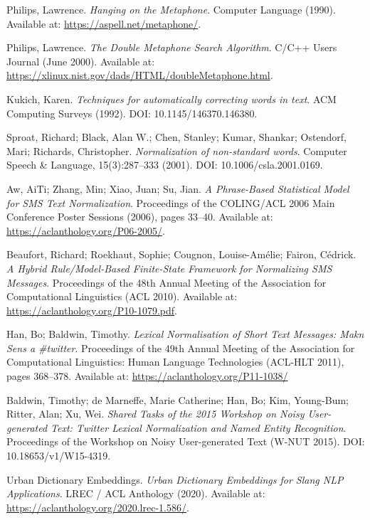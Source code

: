 \documentclass[12pt]{article}
\begin{document}
\begin{thebibliography}{9}
Philips, Lawrence.
\textit{Hanging on the Metaphone}.
Computer Language (1990).
Available at: \url{https://aspell.net/metaphone/}.

Philips, Lawrence.
\textit{The Double Metaphone Search Algorithm}.
C/C++ Users Journal (June 2000).
Available at: \url{https://xlinux.nist.gov/dads/HTML/doubleMetaphone.html}.

Kukich, Karen.
\textit{Techniques for automatically correcting words in text}.
ACM Computing Surveys (1992).
DOI: 10.1145/146370.146380.

Sproat, Richard; Black, Alan W.; Chen, Stanley; Kumar, Shankar; Ostendorf, Mari; Richards, Christopher.
\textit{Normalization of non-standard words}.
Computer Speech \& Language, 15(3):287–333 (2001).
DOI: 10.1006/csla.2001.0169.

Aw, AiTi; Zhang, Min; Xiao, Juan; Su, Jian.
\textit{A Phrase-Based Statistical Model for SMS Text Normalization}.
Proceedings of the COLING/ACL 2006 Main Conference Poster Sessions (2006), pages 33–40.
Available at: \url{https://aclanthology.org/P06-2005/}.

Beaufort, Richard; Roekhaut, Sophie; Cougnon, Louise-Amélie; Fairon, Cédrick.
\textit{A Hybrid Rule/Model-Based Finite-State Framework for Normalizing SMS Messages}.
Proceedings of the 48th Annual Meeting of the Association for Computational Linguistics (ACL 2010).
Available at: \url{https://aclanthology.org/P10-1079.pdf}.

Han, Bo; Baldwin, Timothy.
\textit{Lexical Normalisation of Short Text Messages: Makn Sens a \#twitter}.
Proceedings of the 49th Annual Meeting of the Association for Computational Linguistics: Human Language Technologies (ACL-HLT 2011), pages 368–378.
Available at: \url{https://aclanthology.org/P11-1038/}

Baldwin, Timothy; de Marneffe, Marie Catherine; Han, Bo; Kim, Young-Bum; Ritter, Alan; Xu, Wei.
\textit{Shared Tasks of the 2015 Workshop on Noisy User-generated Text: Twitter Lexical Normalization and Named Entity Recognition}.
Proceedings of the Workshop on Noisy User-generated Text (W-NUT 2015).
DOI: 10.18653/v1/W15-4319.

Urban Dictionary Embeddings.
\textit{Urban Dictionary Embeddings for Slang NLP Applications}.
LREC / ACL Anthology (2020).
Available at: \url{https://aclanthology.org/2020.lrec-1.586/}.


\end{thebibliography}
\end{document}
